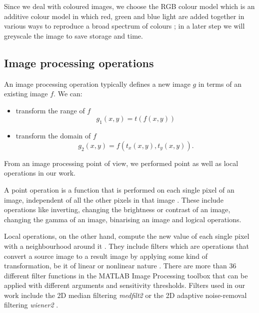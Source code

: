 Since we deal with coloured images, we choose the RGB colour model which is an additive colour model in which red, green and blue light are added together in various ways to reproduce a broad spectrum of colours \cite{ibraheem2012understanding}; in a later step we will greyscale the image to save storage and time.


\subsection{Image processing operations}

An image processing operation typically defines a new image \( g \) in terms of an existing image \( f \).
We can: 
\begin{itemize}
	\item transform the range of \( f \)
	\[ 
	g_{1}(x, y) = t(f(x,y)) 
	\]
	\item transform the domain of \( f \)
	\[
	g_{2}(x,y) = f(t_{x}(x,y), t_{y}(x,y)).
	\]
\end{itemize}


From an image processing point of view, we performed point as well as local operations in our work.

A point operation is a function that is performed on each single pixel of an image, independent of all the other pixels in that image \cite{maini2010comprehensive}. These include operations like inverting, changing the brightness or contrast of an image, changing the gamma of an image, binarising an image and logical operations. 

Local operations, on the other hand, compute the new value of each single pixel with a neighbourhood around it \cite{pointOperation2018}. %
They include filters which are operations that convert a source image to a result image by applying some kind of transformation, be it of linear or nonlinear nature \cite{pointOperation2018}. There are more than 36 different filter functions in the MATLAB Image Processing toolbox \cite{matlab} that can be applied with different arguments and sensitivity thresholds. Filters used in our work include the 2D median filtering \textit{medfilt2} or the 2D adaptive noise-removal filtering \textit{wiener2} \cite{matlab}.


